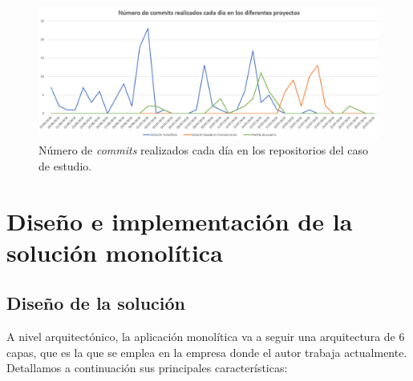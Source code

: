 \documentclass[11pt,spanish,listoffigures]{tfgetsinf}
\begin{document}
\begin{figure}[h]
\centering
\includegraphics[scale=0.5]{commits}
\caption{Número de \textit{commits} realizados cada día en los repositorios del caso de estudio.}
\end{figure}

%

\chapter{Diseño e implementación de la solución monolítica}

\section{Diseño de la solución} \label{sct:DiseñoMonolitico}

A nivel arquitectónico, la aplicación monolítica va a seguir una arquitectura de 6 capas, que es la que se emplea en la empresa donde el autor trabaja actualmente. Detallamos a continuación sus principales características:
\end{document}
